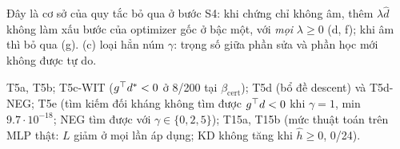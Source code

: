 \begin{hequa}
Đây là cơ sở của quy tắc bỏ qua ở bước S4: khi chứng chỉ không âm, thêm $\lambda\hat d$ không làm xấu bước của optimizer gốc ở bậc một, với \emph{mọi} $\lambda\ge0$ (d, f); khi âm thì bỏ qua (g). (c) loại hẳn núm $\gamma$: trọng số giữa phần sửa và phần học mới không được tự do.
\end{hequa}
\begin{kiem}
T5a, T5b; T5c-WIT ($g^{\top} d^*<0$ ở 8/200 tại $\beta_{\mathrm{cert}}$); T5d (bổ đề descent) và T5d-NEG; T5e (tìm kiếm đối kháng không tìm được $g^{\top} d<0$ khi $\gamma=1$, min $9.7\cdot10^{-18}$; NEG tìm được với $\gamma\in\{0,2,5\}$); T15a, T15b (mức thuật toán trên MLP thật: $L$ giảm ở mọi lần áp dụng; KD không tăng khi $\hat h\ge0$, 0/24).
\end{kiem}
